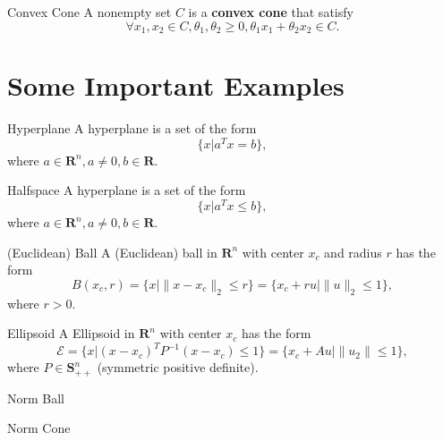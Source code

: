 \begin{definition}{Convex Cone}{}
    A nonempty set $C$ is a \textbf{convex cone} that satisfy $$\forall x_1,x_2\in C, \theta_1,\theta_2\geq 0,\theta_1 x_1+\theta_2 x_2\in C.$$
\end{definition}

\section{Some Important Examples}

\begin{definition}{Hyperplane}{}
    A hyperplane is a set of the form $$\{x|a^Tx=b\},$$ where $a\in\mathbf{R}^n,a\neq 0,b\in\mathbf{R}$.
\end{definition}


\begin{definition}{Halfspace}{}
    A hyperplane is a set of the form $$\{x|a^Tx\leq b\},$$ where $a\in\mathbf{R}^n,a\neq 0,b\in\mathbf{R}$.
\end{definition}


\begin{definition}{(Euclidean) Ball}{}
    A (Euclidean) ball in $\mathbf{R}^n$ with center $x_c$ and radius $r$ has the form $$B(x_c,r)=\{x\vert\|x-x_c\|_2\leq r\}=\{x_c+ru\vert\|u\|_2\leq 1\},$$ where $r>0$.
\end{definition}

\begin{definition}{Ellipsoid}{}
    A Ellipsoid in $\mathbf{R}^n$ with center $x_c$ has the form $$\mathcal{E}=\{x\vert(x-x_c)^TP^{-1}(x-x_c)\leq 1\}=\{x_c+Au\vert \|u_2\|\leq 1\},$$ where $P\in\mathbf{S}^{n}_{++}$ (symmetric positive definite).
\end{definition}

\begin{definition}{Norm Ball}{}
    
\end{definition}

\begin{definition}{Norm Cone}{}
    
\end{definition}

